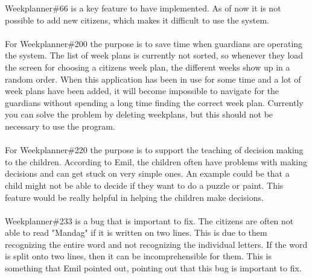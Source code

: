 \noindent
Weekplanner\#66 is a key feature to have implemented. 
As of now it is not possible to add new citizens, which makes it difficult to use the system. 
\\\\
For Weekplanner\#200 the purpose is to save time when guardians are operating the system. 
The list of week plans is currently not sorted, so whenever they load the screen for choosing a citizens week plan, the different weeks show up in a random order. 
When this application has been in use for some time and a lot of week plans have been added, it will become impossible to navigate for the guardians without spending a long time finding the correct week plan.
Currently you can solve the problem by deleting weekplans, but this should not be necessary to use the program.
\\\\
For Weekplanner\#220 the purpose is to support the teaching of decision making to the children.
According to Emil, the children often have problems with making decisions and can get stuck on very simple ones. 
An example could be that a child might not be able to decide if they want to do a puzzle or paint.
This feature would be really helpful in helping the children make decisions.
\\\\
Weekplanner\#233 is a bug that is important to fix.
The citizens are often not able to read "Mandag" if it is written on two lines. 
This is due to them recognizing the entire word and not recognizing the individual letters. 
If the word is split onto two lines, then it can be incomprehensible for them.
This is something that Emil pointed out, pointing out that this bug is important to fix.

